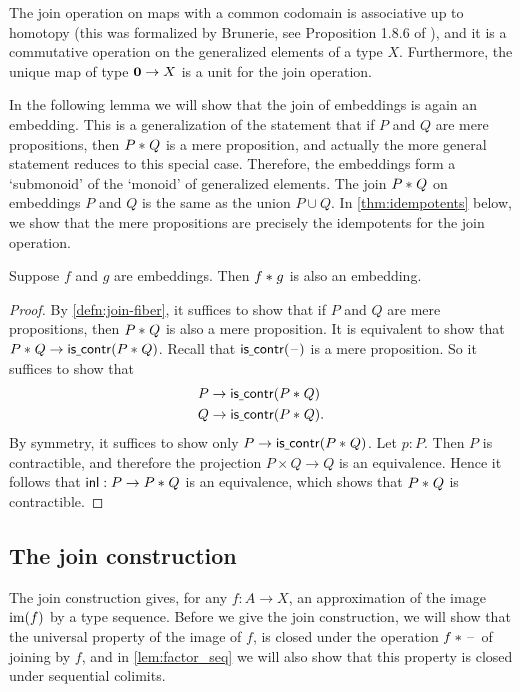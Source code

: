 \begin{rmk}
The join operation on maps with a common codomain is associative up to homotopy (this was formalized by Brunerie, see Proposition 1.8.6 of \cite{BruneriePhD}), and it is a commutative operation on the generalized elements of a type $X$. Furthermore, the unique map of type $\mathbf{0}\to X$ is a unit for the join operation.
\end{rmk}

 In the following lemma we will show that the join of embeddings is again an embedding. This is a generalization of the statement that if $P$ and
$Q$ are mere propositions, then ${P}\ast_{}{Q}$ is a mere proposition, and actually the more general statement reduces to this special case. Therefore, the embeddings form a `submonoid' of the `monoid' of generalized elements. The join ${P}\ast_{}{Q}$ on embeddings $P$ and $Q$ is the same as the union $P\cup Q$. In \autoref{thm:idempotents} below, we show that the mere propositions are precisely the idempotents for the join operation.

\begin{lem}
Suppose $f$ and $g$ are embeddings. Then ${f}\ast_{}{g}$ is also an embedding.
\end{lem}

\begin{proof}
By \autoref{defn:join-fiber}, it suffices to show that if $P$ and $Q$ are mere
propositions, then ${P}\ast_{}{Q}$ is also a mere proposition. It is equivalent
to show that ${P}\ast_{}{Q}\to\mathsf{is\underline{\ }{}contr}({P}\ast_{}{Q})$. Recall that $\mathsf{is\underline{\ }{}contr}(\mathord{\hspace{1pt}\text{--}\hspace{1pt}})$
is a mere proposition. So it suffices to show that
\begin{align*}
& P \to \mathsf{is\underline{\ }{}contr}({P}\ast_{}{Q}) \\
& Q \to \mathsf{is\underline{\ }{}contr}({P}\ast_{}{Q}).
\end{align*}
By symmetry, it suffices to show only $P\to\mathsf{is\underline{\ }{}contr}({P}\ast_{}{Q})$. Let $p:P$. 
Then $P$ is contractible, and therefore the projection $P\times Q\to Q$ is an
equivalence. Hence it follows that ${\mathsf{inl}}:P\to {P}\ast_{}{Q}$ is an equivalence,
which shows that ${P}\ast_{}{Q}$ is contractible.
\end{proof}

\subsection{The join construction}\label{sec:join-construction}

The join construction gives, for any $f:A\to X$, an approximation of the image
$\operatorname{im}(f)$ by a type sequence. 
Before we give the join construction, we will show that the universal
property of the image of $f$, is closed under
the operation ${f}\ast_{}{\mathord{\hspace{1pt}\text{--}\hspace{1pt}}}$ of joining by $f$, and in \autoref{lem:factor_seq}
we will also show that this property is closed under sequential colimits.

